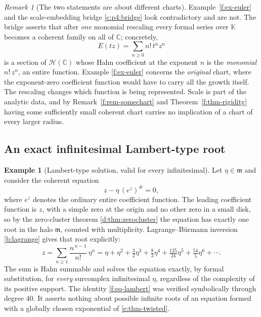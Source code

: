\documentclass[11pt,a4paper]{article}
\numberwithin{equation}{section}
\theoremstyle{definition}
\newtheorem{example}[theorem]{Example}
\theoremstyle{remark}
\newtheorem{remark}[theorem]{Remark}
\theoremstyle{plain}
\newcommand{\K}{\mathbb K}
\newcommand{\CC}{\mathbb C}
\newcommand{\mm}{\mathfrak m}
\newcommand{\ev}[1]{#1^{\#}}
\newcommand{\Hc}{\mathcal H}
\begin{document}
\begin{remark}[The two statements are about different
charts]\label{f:rem-chartreconciliation}
Example~\ref{f:ex-euler} and the scale-embedding bridge
\ref{c:p4:bridge} look contradictory and are not.  The bridge
asserts that after \emph{one} monomial rescaling every formal series
over $\K$ becomes a coherent family on all of $\CC$; concretely,
\[
 E(tz)=\sum_{n\ge0}n!\,t^{n}z^{n}
\]
is a section of $\Hc(\CC)$ whose Hahn coefficient at the exponent $n$ is
the \emph{monomial} $n!\,z^{n}$, an entire function.  Example
\ref{f:ex-euler} concerns the \emph{original} chart, where the
exponent-zero coefficient function would have to carry all the growth
itself.  The rescaling changes which function is being represented.
Scale is part of the analytic data, and by
Remark~\ref{f:rem-somechart} and Theorem~\ref{f:thm-rigidity} having
some sufficiently small coherent chart carries no implication of a chart
of every larger radius.
\end{remark}

\subsection{An exact infinitesimal Lambert-type root}
\label{f:sub-lambert}

\begin{example}[Lambert-type solution, valid for every
infinitesimal]\label{f:ex-lambert}
Let $\eta\in\mm$ and consider the coherent equation
\[
 z-\eta\,\ev{(e^{z})}=0,
\]
where $e^{z}$ denotes the ordinary entire coefficient function.  The
leading coefficient function is $z$, with a simple zero at the origin
and no other zero in a small disk, so by the zero-cluster theorem
\ref{d:thm:zerocluster} the equation has exactly one root in the halo
$\mm$, counted with multiplicity.  Lagrange--B\"urmann inversion
\ref{b:lagrange} gives that root explicitly:
\begin{equation}\label{f:eq-lambert}
 z=\sum_{n\ge1}\frac{n^{\,n-1}}{n!}\,\eta^{n}
  =\eta+\eta^{2}+\tfrac32\eta^{3}+\tfrac83\eta^{4}
   +\tfrac{125}{24}\eta^{5}+\tfrac{54}{5}\eta^{6}+\cdots .
\end{equation}
The sum is Hahn summable and solves the equation exactly, by formal
substitution, for \emph{every} surcomplex infinitesimal $\eta$,
regardless of the complexity of its positive support.  The identity
\eqref{f:eq-lambert} was verified symbolically through degree $40$.  It
asserts nothing about possible infinite roots of an equation formed with
a globally chosen exponential of \ref{e:thm-twisted}.
\end{example}
\end{document}

